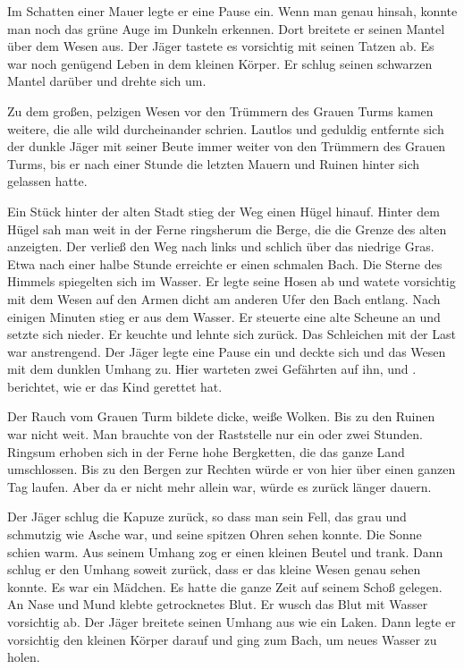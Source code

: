 \begin{huge}
Im Schatten einer Mauer legte er eine Pause ein. Wenn man genau hinsah, konnte man noch das grüne Auge im Dunkeln erkennen. Dort breitete er seinen Mantel über dem Wesen aus. Der Jäger tastete es vorsichtig mit seinen Tatzen ab. Es war noch genügend Leben in dem kleinen Körper. Er schlug seinen schwarzen Mantel darüber und drehte sich um.

Zu dem großen, pelzigen Wesen vor den Trümmern des Grauen Turms kamen weitere, die alle wild durcheinander schrien. Lautlos und geduldig entfernte sich der dunkle Jäger mit seiner Beute immer weiter von den Trümmern des Grauen Turms, bis er nach einer Stunde die letzten Mauern und Ruinen hinter sich gelassen hatte.

Ein Stück hinter der alten Stadt stieg der Weg einen Hügel hinauf. Hinter dem Hügel sah man weit in der Ferne ringsherum die Berge, die die Grenze des alten  anzeigten. Der \Schattenjager verließ den Weg nach links und schlich über das niedrige Gras. Etwa nach einer halbe Stunde erreichte er einen schmalen Bach. Die Sterne des Himmels spiegelten sich im Wasser. Er legte seine Hosen ab und watete vorsichtig mit dem Wesen auf den Armen dicht am anderen Ufer den Bach entlang. Nach einigen Minuten stieg er aus dem Wasser. Er steuerte eine alte Scheune an und setzte sich nieder. Er keuchte und lehnte sich zurück. Das Schleichen mit der Last war anstrengend. Der Jäger legte eine Pause ein und deckte sich und das Wesen mit dem dunklen Umhang zu. Hier warteten zwei Gefährten auf ihn, \Bomar und \Dolo.
\Eno berichtet, wie er das Kind gerettet hat.

Der Rauch vom Grauen Turm bildete dicke, weiße Wolken. Bis zu den Ruinen war nicht weit. Man brauchte von der Raststelle nur ein oder zwei Stunden. Ringsum erhoben sich in der Ferne hohe Bergketten, die das ganze Land umschlossen. Bis zu den Bergen zur Rechten würde er von hier über einen ganzen Tag laufen. Aber da er nicht mehr allein war, würde es zurück länger dauern.

Der Jäger schlug die Kapuze zurück, so dass man sein Fell, das grau und schmutzig wie Asche war, und seine spitzen Ohren sehen konnte. Die Sonne schien warm. Aus seinem Umhang zog er einen kleinen Beutel und trank. Dann schlug er den Umhang soweit zurück, dass er das kleine Wesen genau sehen konnte. Es war ein Mädchen. Es hatte die ganze Zeit auf seinem Schoß gelegen. An Nase und Mund klebte getrocknetes Blut. Er wusch das Blut mit Wasser vorsichtig ab. Der Jäger breitete seinen Umhang aus wie ein Laken. Dann legte er vorsichtig den kleinen Körper darauf und ging zum Bach, um neues Wasser zu holen.


\end{huge}
